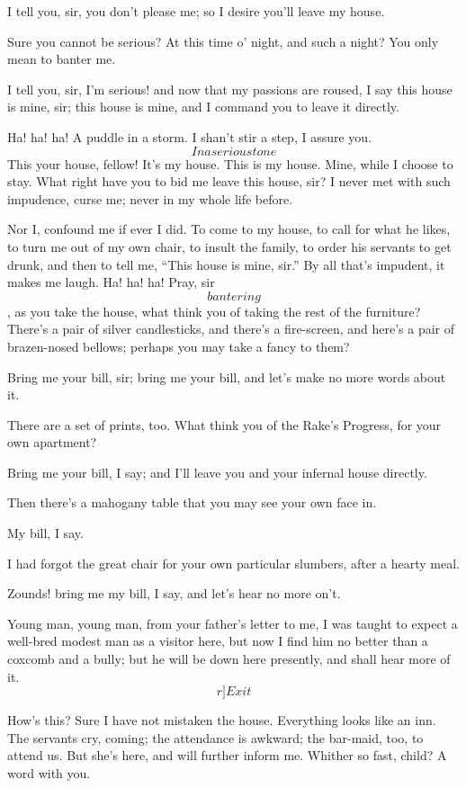 \documentclass{book}
\begin{document}
\3  I tell you, sir, you don't please me; so I desire you'll
leave my house.

\2  Sure you cannot be serious?  At this time o' night, and such a
night?  You only mean to banter me.

\3  I tell you, sir, I'm serious! and now that my passions are
roused, I say this house is mine, sir; this house is mine, and I
command you to leave it directly.

\2  Ha! ha! ha!  A puddle in a storm.  I shan't stir a step, I
assure you.  \[In a serious tone\]  This your house, fellow!  It's my
house.  This is my house.  Mine, while I choose to stay.  What right
have you to bid me leave this house, sir?  I never met with such
impudence, curse me; never in my whole life before.

\3  Nor I, confound me if ever I did.  To come to my house, to
call for what he likes, to turn me out of my own chair, to insult the
family, to order his servants to get drunk, and then to tell me, ``This
house is mine, sir.''  By all that's impudent, it makes me laugh.  Ha!
ha! ha!  Pray, sir \[bantering\], as you take the house, what think you
of taking the rest of the furniture?  There's a pair of silver
candlesticks, and there's a fire-screen, and here's a pair of
brazen-nosed bellows; perhaps you may take a fancy to them?

\2  Bring me your bill, sir; bring me your bill, and let's make no
more words about it.

\3  There are a set of prints, too.  What think you of the
Rake's Progress, for your own apartment?

\2  Bring me your bill, I say; and I'll leave you and your
infernal house directly.

\3  Then there's a mahogany table that you may see your own
face in.

\2  My bill, I say.

\3  I had forgot the great chair for your own particular
slumbers, after a hearty meal.

\2  Zounds! bring me my bill, I say, and let's hear no more on't.

\3  Young man, young man, from your father's letter to me, I
was taught to expect a well-bred modest man as a visitor here, but now
I find him no better than a coxcomb and a bully; but he will be down
here presently, and shall hear more of it.  \[r]Exit\]

\2  How's this?  Sure I have not mistaken the house.  Everything
looks like an inn.  The servants cry, coming; the attendance is
awkward; the bar-maid, too, to attend us.  But she's here, and will
further inform me.  Whither so fast, child?  A word with you.
\end{document}
